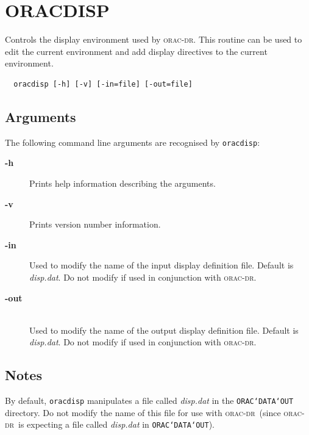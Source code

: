 \documentclass[twoside,11pt]{article}
\newcommand{\xlabel}[1]{}
\renewcommand{\_}{\texttt{\symbol{95}}}
\def\C++{{\rm C\kern-.05em\raise.3ex\hbox{\footnotesize ++}}}
\newcommand{\underscore}{\_}
\newcommand{\oracdr}{\textsc{orac-dr}}
\begin{document}

\section{ORACDISP\xlabel{oracdisp}}


Controls the display environment used by \oracdr. This routine
can be used to edit the current environment and add display directives
to the current environment.

\begin{verbatim}
  oracdisp [-h] [-v] [-in=file] [-out=file]
\end{verbatim}


\subsection*{Arguments}

The following command line arguments are recognised by {\tt oracdisp}:

\begin{description}

\item[{\bf -h}]

Prints help information describing the arguments.

\item[{\bf -v}]

Prints version number information.

\item[{\bf -in}]

Used to modify the name of the input display definition file.
Default is {\em disp.dat\/}. Do not modify if used in conjunction with
\oracdr.

\item[{\bf -out}]
\hfil\\
Used to modify the name of the output display definition file.
Default is {\em disp.dat\/}. Do not modify if used in conjunction with
\oracdr.

\end{description}

\subsection*{Notes}
By default, {\tt oracdisp} manipulates a file called {\em disp.dat\/}
in the {\tt ORAC\char`\_DATA\char`\_OUT} directory. Do not modify the name of this
file for use with \oracdr\ (since \oracdr\ is expecting a file
called {\em disp.dat\/} in {\tt ORAC\char`\_DATA\char`\_OUT}).
\end{document}
